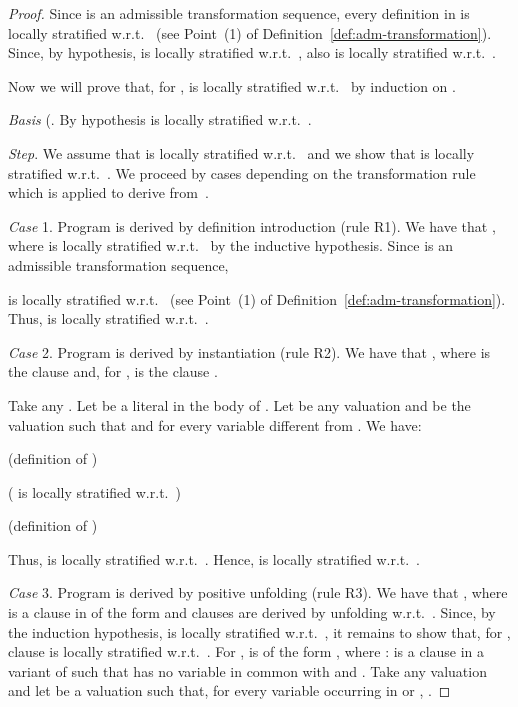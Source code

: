 \documentclass[english]{tlp}
\begin{document}
\begin{proof}
Since  is an admissible transformation
sequence, every definition in  
is locally stratified w.r.t.~ (see Point~(1) of
Definition~\ref{def:adm-transformation}). Since, by hypothesis, 
is locally stratified w.r.t.~, also  is locally stratified w.r.t.~.

\noindent Now we will prove that, for ,  is locally stratified w.r.t.~ by induction on .

\medskip

\noindent \emph{Basis} (. By hypothesis  is
locally stratified w.r.t.~.

\medskip

\noindent \emph{Step}. We assume that  is
locally stratified w.r.t.~ and we show that  is locally stratified w.r.t.~. We proceed by cases
depending on the transformation rule which is applied to derive  from~.

\medskip

\noindent \emph{Case} 1. Program  is derived by
definition introduction (rule R1). We have that , where  is locally
stratified w.r.t.~ by the inductive hypothesis. Since
 is an admissible transformation sequence, 
 
is locally stratified w.r.t.~
(see Point~(1) of Definition~\ref{def:adm-transformation}). Thus,  is locally
stratified w.r.t.~.

\medskip

\noindent \emph{Case} 2. Program  is derived by
instantiation (rule R2). We have that
,
where  is the clause  and, for
,  is the clause . 

\noindent Take any . 
Let  be a literal in the body of . Let 
be any valuation and  be the valuation such that
 and  for every
variable  different from . We have:

\smallskip

\makebox[3.3cm][l]{}
\makebox[4cm][l]{}
 (definition of )

\hspace*{3.3cm} \makebox[4cm][l]{} ( is
locally stratified w.r.t.~)

\hspace*{3.3cm} \makebox[4cm][l]{} (definition of )

\smallskip

\noindent Thus,  is locally stratified w.r.t.~.
Hence,  is locally stratified w.r.t.~.

\medskip

\noindent \emph{Case} 3. Program  is derived by
positive unfolding (rule R3). We have that ,
where  is a clause in  of the form  and clauses  are derived by unfolding 
w.r.t.~. Since, by the induction hypothesis,  is locally stratified w.r.t.~,
it remains to show that, for , clause  is locally stratified w.r.t.~. For ,  is of the form , where :  is a clause in a variant of   
such that  has no variable in common with  and
. Take any valuation  and let
 be a valuation such that, for every variable  occurring in
 or , .


\end{proof}
\end{document}
